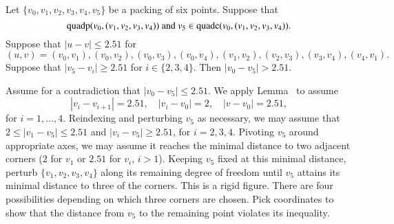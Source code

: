 \begin{tarskidata}
\begin{tarski}

\begin{lemma}
Let $\{v_0,v_1,v_2,v_3,v_4,v_5\}$ be a packing of six points.
Suppose that 
  $${\operatorname{quadp}}(v_0,(v_1,v_2,v_3,v_4)) \text{ and }
   v_5\in {\operatorname{quadc}}(v_0,(v_1,v_2,v_3,v_4)).$$
Suppose that $|u-v|\le 2.51$ for
  $$(u,v)=(v_0,v_1), (v_0,v_2), (v_0,v_3), (v_0,v_4), 
  (v_1,v_2), (v_2,v_3), (v_3,v_4), (v_4,v_1).$$
Suppose that
$|v_5-v_i|\ge 2.51$ for $i\in\{2,3,4\}$.  Then
$|v_0-v_5| > 2.51$.
\end{lemma}



\begin{proved} Assume for a contradiction that $|v_0-v_5|\le2.51$.
We apply Lemma~ to assume
    $$|v_i-v_{i+1}|=2.51,\quad |v_i-v_0|=2, \quad |v-v_0|=2.51,$$
for $i=1,\ldots,4$. Reindexing and perturbing $v_5$ as necessary, we
may assume that $2\le |v_1-v_5|\le2.51$ and $|v_i-v_5|\ge2.51$, for
$i=2,3,4$.  Pivoting $v_5$ around appropriate axes, 
we may assume it reaches the minimal
distance to two adjacent corners ($2$ for $v_1$ or $2.51$ for
$v_i$, $i>1$).  Keeping $v_5$ fixed at this minimal distance,
perturb $\{v_1,v_2,v_3,v_4\}$ along its remaining degree of freedom
until $v_5$ attains its minimal distance to three of the corners.
This is a rigid figure.  There are four possibilities depending on
which three corners are chosen. Pick coordinates to show that the
distance from $v_5$ to the remaining point violates its inequality.
\swallowed\end{proved}
\end{tarski}





\begin{tarski}


\end{tarski}
\end{tarskidata}
